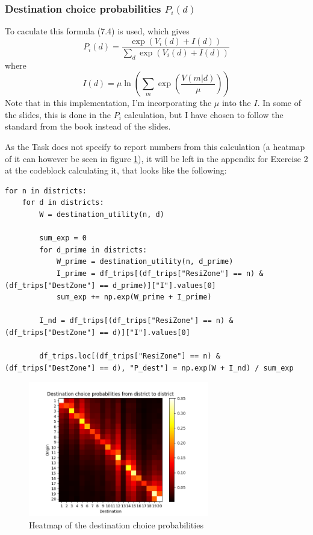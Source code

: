 \documentclass[a4paper,12pt]{article}
\begin{document}
\subsubsection{Destination choice probabilities $P_i(d)$}
To caculate this formula (7.4) is used, which gives 
$$
P_i(d) = \dfrac{\exp(V_i(d) + I(d))}{\sum_d \exp(V_i(d) + I(d))}
$$
where
$$
I(d) = \mu \ln\left(\sum_m \exp\left(\dfrac{V(m|d)}{\mu}\right)\right)
$$
Note that in this implementation, I'm incorporating the $\mu$ into the $I$.
In some of the slides, this is done in the $P_i$ calculation, but I have chosen to follow the standard from the book instead of the slides.

As the Task does not specify to report numbers from this calculation (a heatmap of it can however be seen in figure \ref{fig:destination_choice}), 
it will be left in the appendix for Exercise 2 at the codeblock calculating it, that looks like the following:
\begin{verbatim}
for n in districts:
    for d in districts:
        W = destination_utility(n, d)
        
        sum_exp = 0
        for d_prime in districts:
            W_prime = destination_utility(n, d_prime)
            I_prime = df_trips[(df_trips["ResiZone"] == n) & (df_trips["DestZone"] == d_prime)]["I"].values[0]
            sum_exp += np.exp(W_prime + I_prime)
        
        I_nd = df_trips[(df_trips["ResiZone"] == n) & (df_trips["DestZone"] == d)]["I"].values[0]
        
        df_trips.loc[(df_trips["ResiZone"] == n) & (df_trips["DestZone"] == d), "P_dest"] = np.exp(W + I_nd) / sum_exp
\end{verbatim}

\begin{figure}[h]
    \centering
    \includegraphics[width=0.7\textwidth]{destination_choice.png}
    \caption{Heatmap of the destination choice probabilities}
    \label{fig:destination_choice}
\end{figure}
\end{document}
